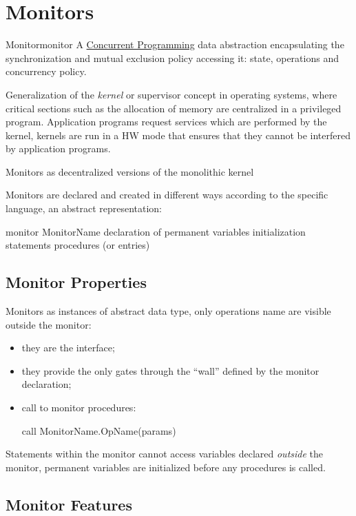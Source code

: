\section{Monitors}\label{sec:pi_monitors} %
\begin{definition}{Monitor}{monitor}
    A \hyperref[def:conc-prog]{Concurrent Programming} data abstraction encapsulating the synchronization and mutual exclusion policy accessing it: state, operations and concurrency policy.
\end{definition}
Generalization of the \textit{kernel} or supervisor concept in operating systems, where critical sections such as the allocation of memory are centralized in a privileged program.
Application programs request services which are performed by the kernel, kernels are run in a HW mode that ensures that they cannot be interfered by application programs.
\begin{note}
    Monitors as decentralized versions of the monolithic kernel
\end{note}
Monitors are declared and created in different ways according to the specific language, an abstract representation:
\begin{codeblock}{}
    monitor MonitorName {
        declaration of permanent variables
        initialization statements
        procedures (or entries)
    }
\end{codeblock}
%
\subsection{Monitor Properties}\label{sub:pi_monitor_properties} %
Monitors as instances of abstract data type, only operations name are visible outside the monitor:
\begin{itemize}
    \item they are the interface;
    \item they provide the only gates through the ``wall'' defined by the monitor declaration;
    \item call to monitor procedures:
        \begin{codeblock}{}
    call MonitorName.OpName(params)
        \end{codeblock}
\end{itemize}
Statements within the monitor cannot access variables declared \textit{outside} the monitor, permanent variables are initialized before any procedures is called.
%
\subsection{Monitor Features}\label{sub:pi_monitor_features} %
